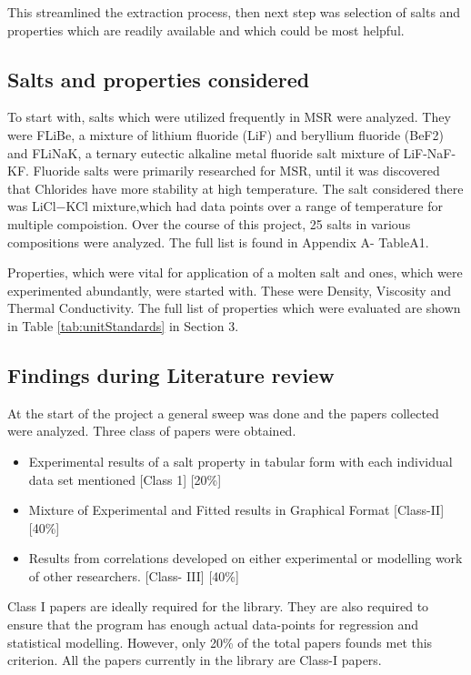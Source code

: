 This streamlined the extraction process, then next step was selection of salts and properties which are readily available and which could be most helpful.

\subsection{Salts and properties considered}
 To start with, salts which were utilized frequently in MSR were analyzed. They were FLiBe, a mixture of lithium fluoride (LiF) and beryllium fluoride (BeF2) and FLiNaK, a ternary eutectic alkaline metal fluoride salt mixture of LiF-NaF-KF. Fluoride salts were primarily researched for MSR, until it was discovered that Chlorides have more stability at high temperature. The salt considered there was LiCl−KCl mixture,which had data points over a range of temperature for multiple compoistion. Over the course of this project, 25 salts in various compositions were analyzed. The full list is found in Appendix A- TableA1.
 
 
Properties, which were vital for application of a molten salt and ones, which were experimented abundantly, were started with. These were Density, Viscosity and Thermal Conductivity. The full list of properties which were evaluated are shown in Table \ref{tab:unitStandards} in Section 3.

\subsection{Findings during Literature review}

At the start of the project a general sweep was done and the papers collected were analyzed. Three class of papers were obtained.
\begin{itemize} 
\item Experimental results of a salt property in tabular form with each individual data set mentioned [Class 1] [20\%]
\item Mixture of Experimental and Fitted results in Graphical Format [Class-II] [40\%]
\item Results from correlations developed on either experimental or modelling work of other researchers. [Class- III] [40\%] 
\end{itemize}

Class I papers are ideally required for the library. They are also required to ensure that the program has enough actual data-points for regression and statistical modelling. However, only 20\% of the total papers founds met this criterion. All the papers currently in the library are Class-I papers. 

